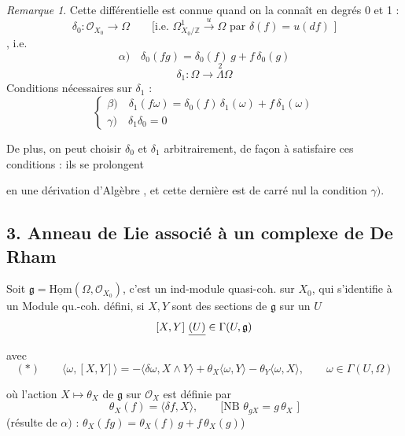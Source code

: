 \documentclass[11pt,a4paper]{article}
\begin{document}
\emph{Remarque 1}. Cette différentielle est connue quand on la connaît en
degrés 0 et 1 :
\[
\delta_0 : \mathcal{O}_{X_0} \longrightarrow \Omega \qquad
\text{[i.e. } \Omega^1_{X_0/\mathbb{Z}} \xrightarrow{\ u\ } \Omega
\text{ par } \delta(f) = u(df)\text{ ]}
\]
, i.e.
\[
\alpha)\quad \delta_0(fg) = \delta_0(f)\,g + f\,\delta_0(g)
\]
\[
\delta_1 : \Omega \longrightarrow \overset{2}{\Lambda}\Omega
\]
Conditions nécessaires sur $\delta_1$ :
\[
\begin{cases}
\beta)\quad \delta_1(f\omega) = \delta_0(f)\,\delta_1(\omega) + f\,\delta_1(\omega) \\
\gamma)\quad \delta_1\delta_0 = 0
\end{cases}
\]

De plus, on peut choisir $\delta_0$ et $\delta_1$ arbitrairement, de façon à
satisfaire ces conditions : ils se prolongent 

 en une \struck{\ill{}} dérivation d'Algèbre
, et cette dernière est de
carré nul  la condition $\gamma)$.

\subsection*{3.  Anneau de Lie associé à un complexe de De Rham}

Soit $\mathfrak{g} = \underline{\mathrm{Hom}}(\Omega, \mathcal{O}_{X_0})$,
c'est un ind-module quasi-coh. sur $X_0$, qui s'identifie à un Module
qu.-coh.  défini, si $X, Y$ sont des sections de
$\mathfrak{g}$ \struck{\ill{}} sur un $U$
\[
[X,Y]\ \struck{(U)} \in \Gamma(U, \mathfrak{g})
\]
avec
\[
(*)\qquad \langle \omega, [X,Y] \rangle
= -\langle \delta\omega, X \wedge Y \rangle + \theta_X \langle \omega, Y \rangle
- \theta_Y \langle \omega, X \rangle ,
\qquad \omega \in \Gamma(U, \Omega)
\]

où l'action $X \mapsto \theta_X$ de $\mathfrak{g}$ sur $\mathcal{O}_X$
 est définie par
\[
\theta_X(f) = \langle \delta f, X \rangle ,
\qquad
\text{[NB } \boxed{\theta_{gX} = g\,\theta_X} \text{ ]}
\]
(résulte de $\alpha)$ : $\theta_X(fg) = \theta_X(f)\,g + f\,\theta_X(g)$)
\end{document}
